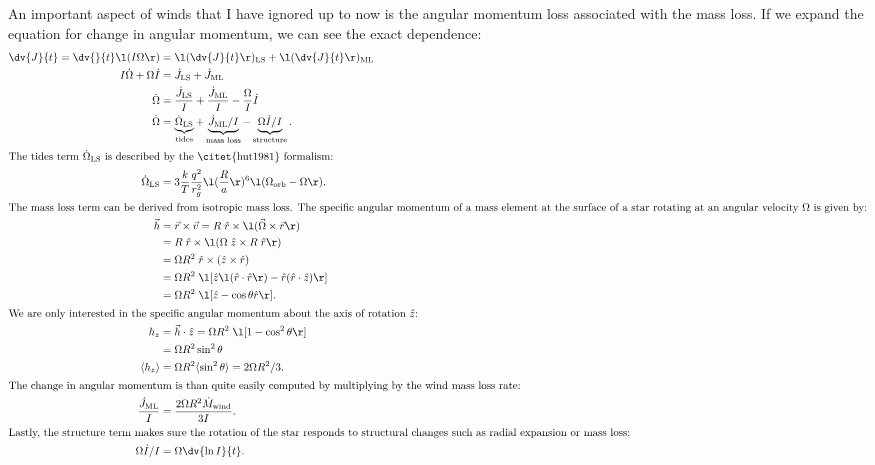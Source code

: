 \documentclass[a4paper,10pt]{article}
\begin{document}
An important aspect of winds that I have ignored up to now is the angular momentum loss associated with the mass loss.
If we expand the equation for change in angular momentum, we can see the exact dependence:
\begin{align*}
    \dv{J}{t} = \dv{}{t}\l(I \Omega \r) &= \l( \dv{J}{t}\r)_\text{LS} + \l( \dv{J}{t}\r)_\text{ML} \\
    I \dot{\Omega }  + \Omega \dot{I}  &= \dot{J}_\text{LS} + \dot{J}_\text{ML} \\
    \dot{\Omega}  &= \frac{\dot{J}_\text{LS}}{I} + \frac{\dot{J}_\text{ML}}{I} - \frac{\Omega}{I} \dot{I}\\
    \dot{\Omega}  &= \underbrace{\dot{\Omega }_\text{LS}}_\text{tides} + \underbrace{\dot{J}_\text{ML}/ I}_\text{mass loss} - \underbrace{\Omega \dot{I}/I}_\text{structure}.\\
    \intertext{The tides term \(\dot{\Omega }_\text{LS}\) is described by the \citet{hut1981} formalism:}
    \dot{\Omega }_\text{LS} &= 3 \frac{k}{T} \frac{q^{2}}{r_{g}^{2}}\l(\frac{R}{a}\r)^{6} \l(\Omega_\text{orb} - \Omega\r).\\
    \intertext{The mass loss term can be derived from isotropic mass loss. The specific angular momentum of a mass element at the surface of a star rotating at an angular velocity \(\Omega \) is given by:}
    \vec{h} &= \vec{r}  \times \vec{v}  = R \;\hat{r} \times \l(\vec{\Omega } \times \vec{r} \r)  \\
    &= R\; \hat{r} \times \l(\Omega\; \hat{z} \times R \;\hat{r}\r)\\
    &= \Omega R^2 \;\hat{r} \times (\hat{z} \times \hat{r})\\
    &= \Omega R^2 \;\l[ \hat{z} \l(\hat{r} \cdot \hat{r} \r) - \hat{r} (\hat{r} \cdot \hat{z})\r]\\
    &= \Omega R^2 \;\l[ \hat{z} - \cos \theta \hat{r}\r].\\
    \intertext{We are only interested in the specific angular momentum about the axis of rotation \(\hat{z}\):}
    h_{z} &= \vec{h}\cdot \hat{z} = \Omega R^2 \;\l[ 1 - \cos^{2}  \theta \r]\\
     &= \Omega R^2 \sin^{2}\theta\\
    \langle h_{z}  \rangle & = \Omega R^2 \langle \sin^{2}\theta \rangle = 2\Omega R^{2} / 3.\\
    \intertext{The change in angular momentum is than quite easily computed by multiplying by the wind mass loss rate:}
    \frac{\dot{J}_\text{ML}}{I} &= \frac{2 \Omega R^{2} \dot{M}_\text{wind}}{3 I}.\\
    \intertext{Lastly, the structure term makes sure the rotation of the star responds to structural changes such as radial expansion or mass loss:}
    \Omega \dot{I}  / I &= \Omega \dv{\ln I}{t}.
\end{align*}
\end{document}
